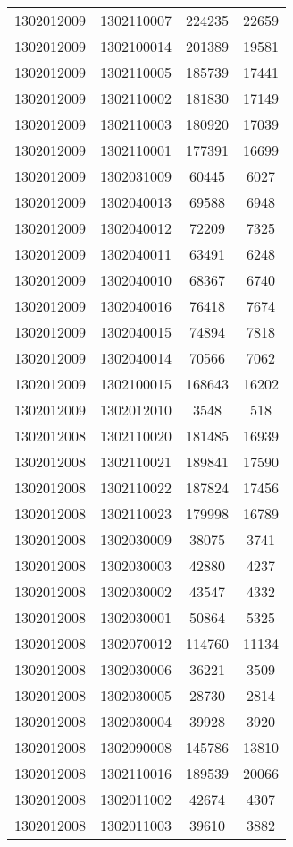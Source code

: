 \begin{longtable}{llcc}
1302012009 & 1302110007 & 224235 & 22659\\
1302012009 & 1302100014 & 201389 & 19581\\
1302012009 & 1302110005 & 185739 & 17441\\
1302012009 & 1302110002 & 181830 & 17149\\
1302012009 & 1302110003 & 180920 & 17039\\
1302012009 & 1302110001 & 177391 & 16699\\
1302012009 & 1302031009 & 60445 & 6027\\
1302012009 & 1302040013 & 69588 & 6948\\
1302012009 & 1302040012 & 72209 & 7325\\
1302012009 & 1302040011 & 63491 & 6248\\
1302012009 & 1302040010 & 68367 & 6740\\
1302012009 & 1302040016 & 76418 & 7674\\
1302012009 & 1302040015 & 74894 & 7818\\
1302012009 & 1302040014 & 70566 & 7062\\
1302012009 & 1302100015 & 168643 & 16202\\
1302012009 & 1302012010 & 3548 & 518\\
1302012008 & 1302110020 & 181485 & 16939\\
1302012008 & 1302110021 & 189841 & 17590\\
1302012008 & 1302110022 & 187824 & 17456\\
1302012008 & 1302110023 & 179998 & 16789\\
1302012008 & 1302030009 & 38075 & 3741\\
1302012008 & 1302030003 & 42880 & 4237\\
1302012008 & 1302030002 & 43547 & 4332\\
1302012008 & 1302030001 & 50864 & 5325\\
1302012008 & 1302070012 & 114760 & 11134\\
1302012008 & 1302030006 & 36221 & 3509\\
1302012008 & 1302030005 & 28730 & 2814\\
1302012008 & 1302030004 & 39928 & 3920\\
1302012008 & 1302090008 & 145786 & 13810\\
1302012008 & 1302110016 & 189539 & 20066\\
1302012008 & 1302011002 & 42674 & 4307\\
1302012008 & 1302011003 & 39610 & 3882\\

\end{longtable}
